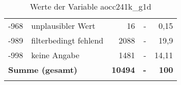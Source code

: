 \begin{longtable}{Xlrrr}
       -968 & unplausibler Wert & 16 & - & 0,15 \\

       -989 & filterbedingt fehlend & 2088 & - & 19,9 \\

       -998 & keine Angabe & 1481 & - & 14,11 \\

     \midrule
     \multicolumn{2}{l}{\textbf{Summe (gesamt)}} & \textbf{10494} & \textbf{-} & \textbf{100} \\
     \bottomrule
     \caption{Werte der Variable aocc241k\_g1d}
     \end{longtable}
     
